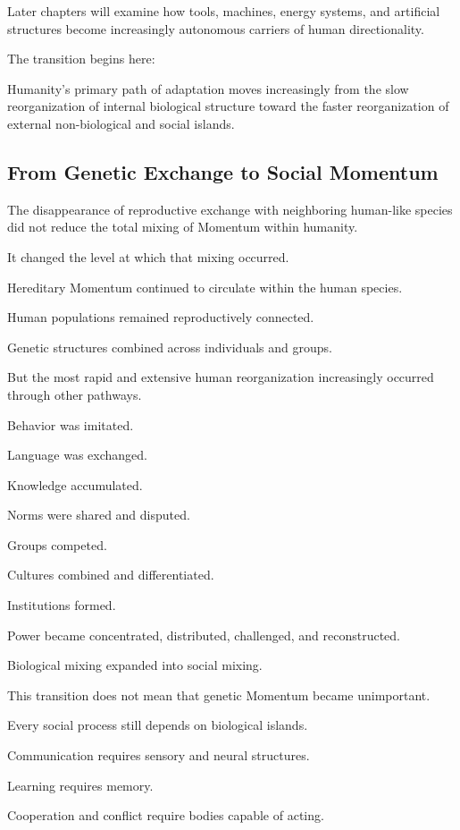 Later chapters will examine how tools, machines, energy systems, and artificial structures become increasingly autonomous carriers of human directionality.

The transition begins here:

Humanity’s primary path of adaptation moves increasingly from the slow reorganization of internal biological structure toward the faster reorganization of external non-biological and social islands.

\subsection*{\textbf{From Genetic Exchange to Social Momentum}}

The disappearance of reproductive exchange with neighboring human-like species did not reduce the total mixing of Momentum within humanity.

It changed the level at which that mixing occurred.

Hereditary Momentum continued to circulate within the human species.

Human populations remained reproductively connected.

Genetic structures combined across individuals and groups.

But the most rapid and extensive human reorganization increasingly occurred through other pathways.

Behavior was imitated.

Language was exchanged.

Knowledge accumulated.

Norms were shared and disputed.

Groups competed.

Cultures combined and differentiated.

Institutions formed.

Power became concentrated, distributed, challenged, and reconstructed.

Biological mixing expanded into social mixing.

This transition does not mean that genetic Momentum became unimportant.

Every social process still depends on biological islands.

Communication requires sensory and neural structures.

Learning requires memory.

Cooperation and conflict require bodies capable of acting.


